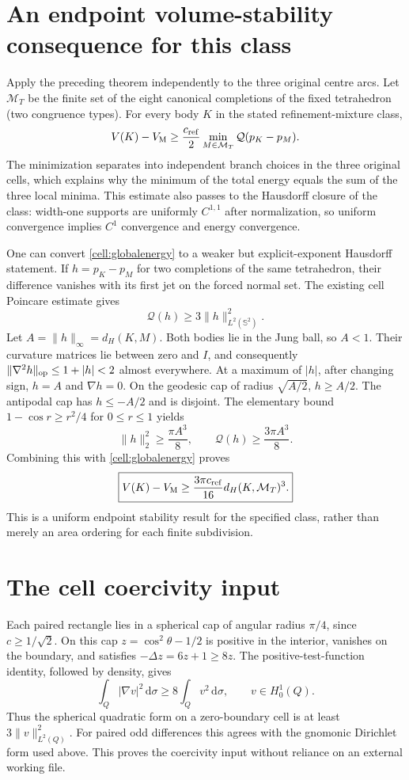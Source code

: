 \documentclass[11pt]{article}
\theoremstyle{remark}\newtheorem{remark}[theorem]{Remark}
\newcommand{\Sph}{\mathbb S^2}
\newcommand{\VM}{V_{\mathrm M}}
\newcommand{\dd}{\,\mathrm d}
\newcommand{\Q}{\mathcal Q}
\begin{document}
\section{An endpoint volume-stability consequence for this class}
Apply the preceding theorem independently to the three original centre arcs. Let $\mathcal M_T$ be the finite set of the eight canonical completions of the fixed tetrahedron (two congruence types). For every body $K$ in the stated refinement-mixture class,
\begin{equation}\label{cell:globalenergy}
 V(K)-\VM\geq\frac{c_{\rm ref}}2
 \min_{M\in\mathcal M_T}\Q(p_K-p_M).
\end{equation}
The minimization separates into independent branch choices in the three original cells, which explains why the minimum of the total energy equals the sum of the three local minima. This estimate also passes to the Hausdorff closure of the class: width-one supports are uniformly $C^{1,1}$ after normalization, so uniform convergence implies $C^1$ convergence and energy convergence.

One can convert \eqref{cell:globalenergy} to a weaker but explicit-exponent Hausdorff statement. If $h=p_K-p_M$ for two completions of the same tetrahedron, their difference vanishes with its first jet on the forced normal set. The existing cell Poincare estimate gives
\[
 \Q(h)\geq3\|h\|_{L^2(\Sph)}^2.
\]
Let $A=\|h\|_\infty=d_H(K,M)$. Both bodies lie in the Jung ball, so $A<1$. Their curvature matrices lie between zero and $I$, and consequently
$\|\nabla^2 h\|_{\rm op}\leq1+|h|<2$ almost everywhere. At a maximum of $|h|$, after changing sign, $h=A$ and $\nabla h=0$. On the geodesic cap of radius $\sqrt{A/2}$, $h\geq A/2$. The antipodal cap has $h\leq-A/2$ and is disjoint. The elementary bound $1-\cos r\geq r^2/4$ for $0\leq r\leq1$ yields
\[
 \|h\|_2^2\geq\frac{\pi A^3}{8},\qquad
 \Q(h)\geq\frac{3\pi A^3}{8}.
\]
Combining this with \eqref{cell:globalenergy} proves
\begin{equation}\label{cell:globalhausdorff}
 \boxed{V(K)-\VM\geq\frac{3\pi c_{\rm ref}}{16}
                 d_H(K,\mathcal M_T)^3.}
\end{equation}
This is a uniform endpoint stability result for the specified class, rather than merely an area ordering for each finite subdivision.


\section{The cell coercivity input}
Each paired rectangle lies in a spherical cap of angular radius $\pi/4$, since $c\geq1/\sqrt2$. On this cap $z=\cos^2\theta-1/2$ is positive in the interior, vanishes on the boundary, and satisfies $-\Delta z=6z+1\geq8z$. The positive-test-function identity, followed by density, gives
\[
 \int_Q|\nabla v|^2\dd\sigma\geq8\int_Qv^2\dd\sigma,
 \qquad v\in H^1_0(Q).
\]
Thus the spherical quadratic form on a zero-boundary cell is at least $3\|v\|_{L^2(Q)}^2$. For paired odd differences this agrees with the gnomonic Dirichlet form used above. This proves the coercivity input without reliance on an external working file.
\end{document}
